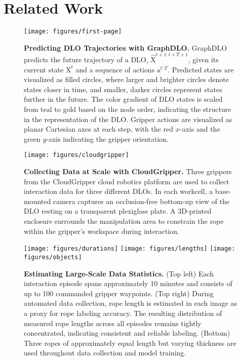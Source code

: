 \documentclass[letterpaper, 10 pt, conference]{IEEETran}
\newcommand{\mat}[1]{\bm{\mathrm{#1}}}
\begin{document}
\section{Related Work}

\begin{figure}[t]
\centering
\texttt{[image: figures/first-page]}
\caption{\textbf{Predicting DLO Trajectories with GraphDLO.}
GraphDLO predicts the future trajectory of a DLO, $\hat{\mat{X}}^{t+1:t+T+1}$, given its current state $\mat{X}^t$ and a sequence of actions $\mat{a}^{t:T}$. Predicted states are visualized as filled circles, where larger and brighter circles denote states closer in time, and smaller, darker circles represent states further in the future. The color gradient of DLO states is scaled from teal to gold based on the node order, indicating the structure in the representation of the DLO. Gripper actions are visualized as planar Cartesian axes at each step, with the red $x$-axis and the green $y$-axis indicating the gripper orientation. \vspace{-2em}}
\label{fig:first-page}
\end{figure}

\begin{figure*}[t]
\centering
\texttt{[image: figures/cloudgripper]}
\caption{\textbf{Collecting Data at Scale with CloudGripper.} Three grippers from the CloudGripper cloud robotics platform are used to collect interaction data for three different DLOs. In each workcell, a base-mounted camera captures an occlusion-free bottom-up view of the DLO resting on a transparent plexiglass plate. A 3D-printed enclosure surrounds the manipulation area to constrain the rope within the gripper’s workspace during interaction.\vspace{-1em}}
\label{fig:robots}
\end{figure*}

\begin{figure}
\centering
\texttt{[image: figures/durations]}
\texttt{[image: figures/lengths]}
\texttt{[image: figures/objects]}
\caption{\textbf{Estimating Large-Scale Data Statistics.} (Top left) Each interaction episode spans approximately 10 minutes and consists of up to 100 commanded gripper waypoints. (Top right) During automated data collection, rope length is estimated in each image as a proxy for rope labeling accuracy. The resulting distribution of measured rope lengths across all episodes remains tightly concentrated, indicating consistent and reliable labeling. (Bottom) Three ropes of approximately equal length but varying thickness are used throughout data collection and model training.\vspace{-3em}}
\label{fig: distribution}
\end{figure}
\end{document}
